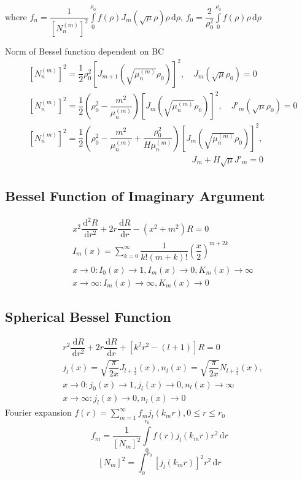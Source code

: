 \documentclass[10pt, a4paper, twocolumn]{article}
\def\d{\,\mathrm{d}}
\begin{document}
	where $f_n = \dfrac{1}{[N^{(m)}_n]^2}\displaystyle\int \limits^{\rho_0}_{0}
		f(\rho)J_m(\sqrt{\mu}\rho)\rho\d \rho$, $f_0 = 
		\dfrac{2}{\rho_0^2}\displaystyle\int\limits^{\rho_0}_0f(\rho)\rho\d \rho$
	
	Norm of Bessel function dependent on BC
	\begin{align*}
		&[N^{(m)}_n]^2 = \dfrac{1}{2} \rho^2_0 [J_{m+1}(\sqrt{\mu^{(m)}_n}\rho_0)]^2,\quad J_m(\sqrt{\mu}\rho_0)=0\\
		&[N^{(m)}_n]^2 = \dfrac{1}{2}\left(\rho_0^2 - \dfrac{m^2}{\mu^{(m)}_n}\right)
			[J_{m}(\sqrt{\mu^{(m)}_n}\rho_0)]^2,\quad J'_m(\sqrt{\mu}\rho_0)=0\\
		&[N^{(m)}_n]^2 = \dfrac{1}{2}\left(\rho_0^2 - \dfrac{m^2}{\mu^{(m)}_n} + \dfrac{\rho^2_0}{H\mu^{(m)}_n}\right)
			[J_{m}(\sqrt{\mu^{(m)}_n}\rho_0)]^2,\\ 
			&\qquad\qquad\qquad\qquad\qquad\qquad\qquad\qquad\qquad\quad J_m + H\sqrt{\mu}J'_m=0
	\end{align*}

\subsection{Bessel Function of Imaginary Argument}

	\begin{align*}
		&x^2\dfrac{\d^2 R}{\d r^2} + 2r\dfrac{\d R}{\d r} - (x^2 + m^2)R=0\\
		&I_m(x)=\sum^\infty_{k=0}\dfrac{1}{k!(m+k)!}\left(\dfrac{x}{2}\right)^{m+2k}\\
		&x\rightarrow 0: I_0(x)\rightarrow 1, I_m(x) \rightarrow 0, K_m(x) \rightarrow \infty\\
		&x\rightarrow \infty: I_m(x)\rightarrow \infty, K_m(x)\rightarrow 0
	\end{align*}

\subsection{Spherical Bessel Function}

	\begin{align*}
		&r^2\dfrac{\d R}{\d r^2} + 2r\dfrac{\d R}{\d r} + [k^2r^2-(l+1)]R=0\\
		&j_l(x) = \sqrt{\dfrac{\pi}{2x}}J_{l+\frac{1}{2}}(x), n_l(x) = \sqrt{\dfrac{\pi}{2x}}N_{l+\frac{1}{2}}(x),\\
		&x\rightarrow 0: j_0(x)\rightarrow 1, j_l(x)\rightarrow 0, n_{l}(x) \rightarrow \infty\\
		&x\rightarrow \infty: j_l(x)\rightarrow 0, n_{l}(x) \rightarrow 0
	\end{align*}
	Fourier expansion $f(r) = \displaystyle\sum^\infty_{m=1}f_mj_l(k_m r), 0 \leq r \leq r_0$
	$$f_m = \dfrac{1}{[N_m]^2} \displaystyle\int \limits^{r_0}_0 f(r)j_l(k_m r)r^2\d r$$
	$$[N_m]^2 = \int^{r_0}_0 [j_l(k_m r)]^2 r^2 \d r$$
	
\end{document}
